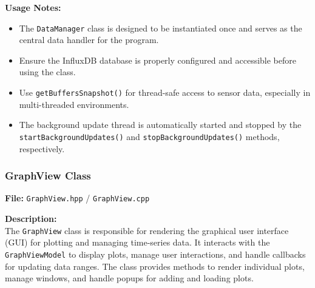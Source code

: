 \documentclass{article}
\begin{document}
\vspace{5pt}
\noindent
\textbf{Usage Notes:}
\begin{itemize}
    \item The \texttt{DataManager} class is designed to be instantiated once and serves as the central data handler for the program.

    \item Ensure the InfluxDB database is properly configured and accessible before using the class.

    \item Use \texttt{getBuffersSnapshot()} for thread-safe access to sensor data, especially in multi-threaded environments.

    \item The background update thread is automatically started and stopped by the \texttt{startBackgroundUpdates()} and \texttt{stopBackgroundUpdates()} methods, respectively.
\end{itemize}


\vspace{10pt}
\subsubsection{GraphView Class}
\textbf{File:} \texttt{GraphView.hpp} / \texttt{GraphView.cpp} 

\vspace{5pt}
\noindent
\textbf{Description:}
\\
\noindent
The \texttt{GraphView} class is responsible for rendering the graphical user interface (GUI) for plotting and managing time-series data. It interacts with the \texttt{GraphViewModel} to display plots, manage user interactions, and handle callbacks for updating data ranges. The class provides methods to render individual plots, manage windows, and handle popups for adding and loading plots.
\end{document}
